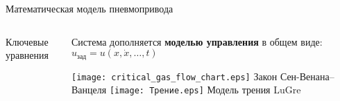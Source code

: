 \begin{frame}{Математическая модель пневмопривода}
\begin{columns}
\begin{column}{0.6\textwidth}
\begin{block}{\small Ключевые уравнения}
\begin{compactitem}
				\end{compactitem}
			\end{block}
		\end{column}

		\begin{column}{0.4\textwidth}
			\scriptsize Система дополняется \textbf{моделью управления} в общем виде:
			\scriptsize $
				u_{\text{зад}} = u(x, \dot{x}, \dots, t)
			$
			\begin{center}
				\texttt{[image: critical\_gas\_flow\_chart.eps]}
				\scriptsize Закон Сен-Венана--Ванцеля
				\texttt{[image: Трение.eps]}
				\scriptsize Модель трения LuGre
			\end{center}
		\end{column}
	\end{columns}
\end{frame}




